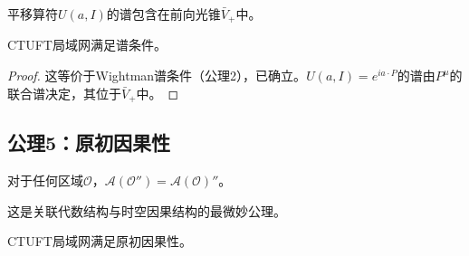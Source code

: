 \begin{axiom}[谱条件]
平移算符$U(a, I)$的谱包含在前向光锥$\bar{V}_+$中。
\end{axiom}

\begin{theorem}[谱条件验证]
CTUFT局域网满足谱条件。
\end{theorem}

\begin{proof}
这等价于Wightman谱条件（公理2），已确立。$U(a, I) = e^{ia \cdot P}$的谱由$P^\mu$的联合谱决定，其位于$\bar{V}_+$中。
\end{proof}

\subsection{公理5：原初因果性}

\begin{axiom}[原初因果性]
对于任何区域$\mathcal{O}$，$\mathcal{A}(\mathcal{O}'') = \mathcal{A}(\mathcal{O})''$。
\end{axiom}

这是关联代数结构与时空因果结构的最微妙公理。

\begin{theorem}[原初因果性验证]
CTUFT局域网满足原初因果性。
\end{theorem}

